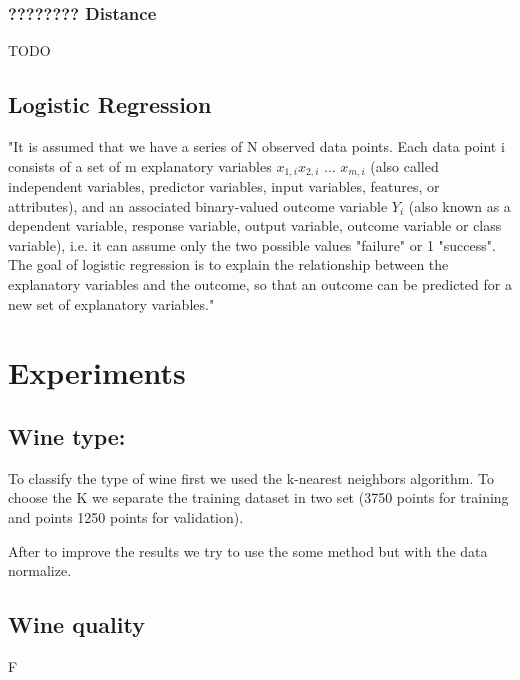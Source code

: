 \documentclass[twoside]{article}
\begin{document}
\begin{multicols}{2}
\subsubsection*{???????? Distance}
TODO 
\subsection*{Logistic Regression}
\indent \par
"It is assumed that we have a series of N observed data points. Each data point i consists of a set of m explanatory variables $x_{1,i} x_{2,i} $ ... $x_{m,i}$ (also called independent variables, predictor variables, input variables, features, or attributes), and an associated binary-valued outcome variable $Y_i$ (also known as a dependent variable, response variable, output variable, outcome variable or class variable), i.e. it can assume only the two possible values "failure" or 1 "success". The goal of logistic regression is to explain the relationship between the explanatory variables and the outcome, so that an outcome can be predicted for a new set of explanatory variables."



\section{Experiments}
\subsection*{Wine type:}
\indent \par
To classify the type of wine first we used the k-nearest neighbors algorithm.
To choose the K we separate the training dataset in two set (3750 points for training and points 1250 points for validation). \par
After to improve the results we try to use the some method but with the data normalize. 

\subsection*{Wine quality}
F




\end{multicols}
\end{document}
